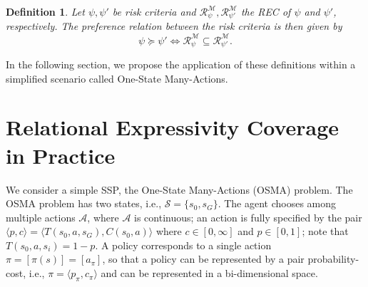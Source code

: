 \documentclass[runningheads]{llncs}
\newtheorem{definit}{Definition}
\begin{document}
\begin{definit}
    Let $\psi, \psi'$ be risk criteria and $\mathcal{R}^{\mathcal{M}}_{\psi}, \mathcal{R}^{\mathcal{M}}_{\psi'}$ the REC of $\psi$ and $\psi'$, respectively. The preference relation between the risk criteria is then given by
    \begin{equation}
        \psi \succeq \psi' \iff \mathcal{R}^{\mathcal{M}}_{\psi} \subseteq \mathcal{R}^{\mathcal{M}}_{\psi'}.
    \end{equation}
\end{definit}

In the following section, we propose the application of these definitions within a simplified scenario called One-State Many-Actions.

\section{Relational Expressivity Coverage in Practice}\label{sec:rel-expressivity-in-practice}

We consider a simple SSP, the One-State Many-Actions (OSMA) problem. The OSMA problem has two states, i.e., $\mathcal{S} = \{s_0, s_G\}$. The agent chooses among multiple actions $\mathcal{A}$, where $\mathcal{A}$ is continuous; an action is fully specified by the pair $\langle p,c \rangle = \langle T(s_{0},a,s_{G}),C(s_{0},a)\rangle$ where $c \in [0, \infty]$ and $p \in [0, 1]$; note that $T(s_{0},a,s_{i})=1-p$. A policy corresponds to a single action $\pi = [\pi(s)] = [a_{\pi}]$, so that a policy can be represented by a pair probability-cost, i.e., $\pi = \langle p_{\pi},c_{\pi} \rangle$ and can be represented in a bi-dimensional space. 
\end{document}

